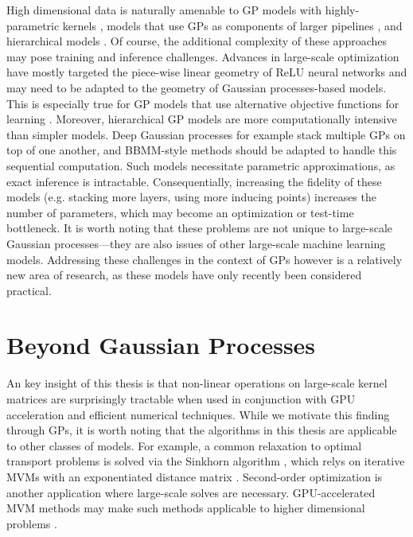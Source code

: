 High dimensional data is naturally amenable to GP models with highly-parametric kernels \cite{wilson2013gaussian,wilson2016stochastic}, models that use GPs as components of larger pipelines \cite{schulam2015framework,futoma2017learning}, and hierarchical models \cite{wilson2012gaussian,salimbeni2017doubly,jankowiak2020deep}.
Of course, the additional complexity of these approaches may pose training and inference challenges.
Advances in large-scale optimization have mostly targeted the piece-wise linear geometry of ReLU neural networks and may need to be adapted to the geometry of Gaussian processes-based models.
This is especially true for GP models that use alternative objective functions for learning \cite{sheth2017excess,knoblauch2019generalized,jankowiak2020parametric}.
Moreover, hierarchical GP models are more computationally intensive than simpler models.
Deep Gaussian processes for example stack multiple GPs on top of one another, and BBMM-style methods should be adapted to handle this sequential computation.
Such models necessitate parametric approximations, as exact inference is intractable.
Consequentially, increasing the fidelity of these models (e.g. stacking more layers, using more inducing points) increases the number of parameters, which may become an optimization or test-time bottleneck.
It is worth noting that these problems are not unique to large-scale Gaussian processes---they are also issues of other large-scale machine learning models.
Addressing these challenges in the context of GPs however is a relatively new area of research, as these models have only recently been considered practical.




\section{Beyond Gaussian Processes}

An key insight of this thesis is that non-linear operations on large-scale kernel matrices are surprisingly tractable when used in conjunction with GPU acceleration and efficient numerical techniques.
While we motivate this finding through GPs, it is worth noting that the algorithms in this thesis are applicable to other classes of models.
For example, a common relaxation to optimal transport problems is solved via the Sinkhorn algorithm \cite{cuturi2013sinkhorn}, which relys on iterative MVMs with an exponentiated distance matrix \cite{altschuler2019massively}.
Second-order optimization is another application where large-scale solves are necessary.
GPU-accelerated MVM methods may make such methods applicable to higher dimensional problems \cite{koh2017understanding}.

